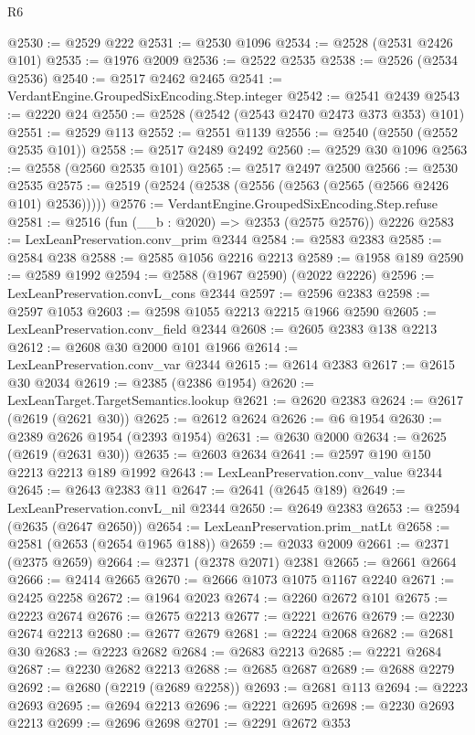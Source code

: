 \begin{lexlean}{R6}
\begin{coremodule}
@2530 := @2529 @222
@2531 := @2530 @1096
@2534 := @2528 (@2531 @2426 @101)
@2535 := @1976 @2009
@2536 := @2522 @2535
@2538 := @2526 (@2534 @2536)
@2540 := @2517 @2462 @2465
@2541 := VerdantEngine.GroupedSixEncoding.Step.integer
@2542 := @2541 @2439
@2543 := @2220 @24
@2550 := @2528 (@2542 (@2543 @2470 @2473 @373 @353) @101)
@2551 := @2529 @113
@2552 := @2551 @1139
@2556 := @2540 (@2550 (@2552 @2535 @101))
@2558 := @2517 @2489 @2492
@2560 := @2529 @30 @1096
@2563 := @2558 (@2560 @2535 @101)
@2565 := @2517 @2497 @2500
@2566 := @2530 @2535
@2575 := @2519 (@2524 (@2538 (@2556 (@2563 (@2565 (@2566 @2426 @101) @2536)))))
@2576 := VerdantEngine.GroupedSixEncoding.Step.refuse
@2581 := @2516 (fun (__b : @2020) => @2353 (@2575 @2576)) @2226
@2583 := LexLeanPreservation.conv_prim @2344
@2584 := @2583 @2383
@2585 := @2584 @238
@2588 := @2585 @1056 @2216 @2213
@2589 := @1958 @189
@2590 := @2589 @1992
@2594 := @2588 (@1967 @2590) (@2022 @2226)
@2596 := LexLeanPreservation.convL_cons @2344
@2597 := @2596 @2383
@2598 := @2597 @1053
@2603 := @2598 @1055 @2213 @2215 @1966 @2590
@2605 := LexLeanPreservation.conv_field @2344
@2608 := @2605 @2383 @138 @2213
@2612 := @2608 @30 @2000 @101 @1966
@2614 := LexLeanPreservation.conv_var @2344
@2615 := @2614 @2383
@2617 := @2615 @30 @2034
@2619 := @2385 (@2386 @1954)
@2620 := LexLeanTarget.TargetSemantics.lookup
@2621 := @2620 @2383
@2624 := @2617 (@2619 (@2621 @30))
@2625 := @2612 @2624
@2626 := @6 @1954
@2630 := @2389 @2626 @1954 (@2393 @1954)
@2631 := @2630 @2000
@2634 := @2625 (@2619 (@2631 @30))
@2635 := @2603 @2634
@2641 := @2597 @190 @150 @2213 @2213 @189 @1992
@2643 := LexLeanPreservation.conv_value @2344
@2645 := @2643 @2383 @11
@2647 := @2641 (@2645 @189)
@2649 := LexLeanPreservation.convL_nil @2344
@2650 := @2649 @2383
@2653 := @2594 (@2635 (@2647 @2650))
@2654 := LexLeanPreservation.prim_natLt
@2658 := @2581 (@2653 (@2654 @1965 @188))
@2659 := @2033 @2009
@2661 := @2371 (@2375 @2659)
@2664 := @2371 (@2378 @2071) @2381
@2665 := @2661 @2664
@2666 := @2414 @2665
@2670 := @2666 @1073 @1075 @1167 @2240
@2671 := @2425 @2258
@2672 := @1964 @2023
@2674 := @2260 @2672 @101
@2675 := @2223 @2674
@2676 := @2675 @2213
@2677 := @2221 @2676
@2679 := @2230 @2674 @2213
@2680 := @2677 @2679
@2681 := @2224 @2068
@2682 := @2681 @30
@2683 := @2223 @2682
@2684 := @2683 @2213
@2685 := @2221 @2684
@2687 := @2230 @2682 @2213
@2688 := @2685 @2687
@2689 := @2688 @2279
@2692 := @2680 (@2219 (@2689 @2258))
@2693 := @2681 @113
@2694 := @2223 @2693
@2695 := @2694 @2213
@2696 := @2221 @2695
@2698 := @2230 @2693 @2213
@2699 := @2696 @2698
@2701 := @2291 @2672 @353

\end{coremodule}
\end{lexlean}
